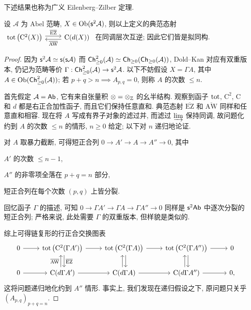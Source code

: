 下述结果也称为广义 Eilenberg--Zilber 定理.

\begin{theorem}\label{prop:Eilenberg-Zilber}
	设 $\mathcal{A}$ 为 Abel 范畴, $X \in \operatorname{Ob}(\mathsf{s}^2 \mathcal{A})$, 则以上定义的典范态射
	$\begin{tikzcd}
		\tot \left(\mathrm{C}^2(X)\right) \arrow[shift left, r, "\overline{\mathrm{EZ}}"] & \mathrm{C}(d(X)) \arrow[shift left, l, "\overline{\mathrm{AW}}"]
	\end{tikzcd}$
	在同调层次互逆; 因此它们皆是拟同构.
\end{theorem}
\begin{proof}
	因为 $\mathsf{s}^2 \mathcal{A} \simeq \mathsf{s}(\mathsf{s}\mathcal{A})$ 而 $\mathsf{Ch}^2_{\geq 0}(\mathcal{A}) \simeq \mathsf{Ch}_{\geq 0}(\mathsf{Ch}_{\geq 0}(\mathcal{A}))$, Dold--Kan 对应有双重版本, 仍记为范畴等价 $\Gamma: \mathsf{Ch}^2_{\geq 0}(\mathcal{A}) \to \mathsf{s}^2 \mathcal{A}$. 以下不妨假设 $X = \Gamma A$, 其中 $A \in \operatorname{Ob}(\mathsf{Ch}^2_{\geq 0}(\mathcal{A}))$; 若 $p+q > n \implies A_{p, q} = 0$, 则称 $A$ 的次数 $\leq n$.
	
	首先假定 $\mathcal{A} = \mathsf{Ab}$, 它有来自张量积 $\otimes = \otimes_{\mathbb{Z}}$ 的幺半结构. 观察到函子 $\operatorname{tot}$, $\mathrm{C}^2$, $\mathrm{C}$ 和 $d$ 都是右正合加性函子, 而且它们保持任意直和. 典范态射 $\overline{\mathrm{EZ}}$ 和 $\overline{\mathrm{AW}}$ 同样和任意直和相容. 现在将 $A$ 写成有界子对象的滤过并, 而滤过 $\varinjlim$ 保持同调, 故问题化约到 $A$ 的次数 $\leq n$ 的情形, $n \geq 0$ 给定; 以下对 $n$ 递归地论证.
	
	对 $A$ 取暴力截断, 可得短正合列 $0 \to A' \to A \to A'' \to 0$, 其中
	\begin{compactitem}
		\item $A'$ 的次数 $\leq n-1$,
		\item $A''$ 的非零项全落在 $p+q=n$ 部分,
		\item 短正合列在每个次数 $(p, q)$ 上皆分裂.
	\end{compactitem}
	回忆函子 $\Gamma$ 的描述, 可知 $0 \to \Gamma A' \to \Gamma A \to \Gamma A'' \to 0$ 同样是 $\mathsf{s}^2 \mathsf{Ab}$ 中逐次分裂的短正合列; 严格来说, 此处需要 $\Gamma$ 的双重版本, 但样貌是类似的.
	
	综上可得链复形的行正合交换图表
	\[\begin{tikzcd}
		0 \arrow[r] & \tot\left( \mathrm{C}^2(\Gamma A') \right) \arrow[shift left, d, "\overline{\mathrm{EZ}}"] \arrow[r] & \tot\left( \mathrm{C}^2(\Gamma A) \right) \arrow[shift left, d] \arrow[r] & \tot\left( \mathrm{C}^2(\Gamma A'') \right) \arrow[shift left, d] \arrow[r] & 0 \\
		0 \arrow[r] & \mathrm{C}(d\Gamma A') \arrow[shift left, u, "\overline{\mathrm{AW}}"] \arrow[r] & \mathrm{C}(d\Gamma A) \arrow[shift left, u] \arrow[r] & \mathrm{C}(d\Gamma A'') \arrow[shift left, u] \arrow[r] & 0,
	\end{tikzcd}\]
	这将问题递归地化约到 $A''$ 情形. 事实上, 我们发现在递归假设之下, 原问题只关乎 $(A_{p, q})_{p+q=n}$.
	

\end{proof}
